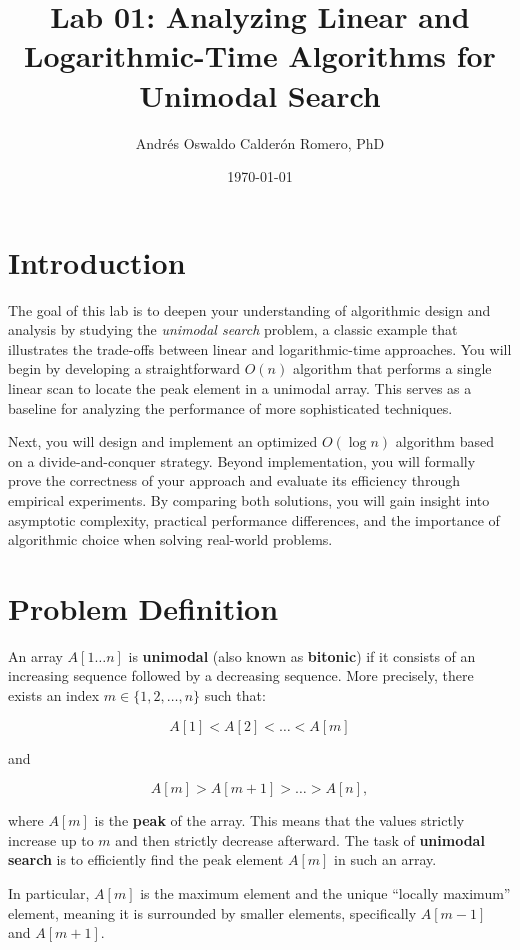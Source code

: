 \documentclass{article}
\title{Lab 01: Analyzing Linear and Logarithmic-Time Algorithms for Unimodal Search}
\author{Andrés Oswaldo Calderón Romero, PhD}
\date{\today}
\begin{document}
\maketitle

\section{Introduction}
The goal of this lab is to deepen your understanding of algorithmic design and analysis by studying the \textit{unimodal search} problem, a classic example that illustrates the trade-offs between linear and logarithmic-time approaches. You will begin by developing a straightforward $O(n)$ algorithm that performs a single linear scan to locate the peak element in a unimodal array. This serves as a baseline for analyzing the performance of more sophisticated techniques.

Next, you will design and implement an optimized $O(\log n)$ algorithm based on a divide-and-conquer strategy. Beyond implementation, you will formally prove the correctness of your approach and evaluate its efficiency through empirical experiments. By comparing both solutions, you will gain insight into asymptotic complexity, practical performance differences, and the importance of algorithmic choice when solving real-world problems.


\section{Problem Definition}
An array $A[1 \ldots n]$ is \textbf{unimodal} (also known as \textbf{bitonic}) if it consists of an increasing sequence followed by a decreasing sequence. More precisely, there exists an index $m \in \{1, 2, \ldots, n\}$ such that:

$$
A[1] < A[2] < \dots < A[m]
$$

and

$$
A[m] > A[m+1] > \dots > A[n],
$$

where $A[m]$ is the \textbf{peak} of the array. This means that the values strictly increase up to $m$ and then strictly decrease afterward. The task of \textbf{unimodal search} is to efficiently find the peak element $A[m]$ in such an array.

In particular, $A[m]$ is the maximum element and the unique ``locally maximum'' element, meaning it is surrounded by smaller elements, specifically $A[m - 1]$ and $A[m + 1]$.
\end{document}
